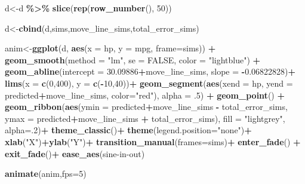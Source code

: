 \documentclass[
]{book}
\newenvironment{Shaded}{\begin{snugshade}}{\end{snugshade}}
\newcommand{\AttributeTok}[1]{\textcolor[rgb]{0.13,0.29,0.53}{#1}}
\newcommand{\ConstantTok}[1]{\textcolor[rgb]{0.56,0.35,0.01}{#1}}
\newcommand{\DecValTok}[1]{\textcolor[rgb]{0.00,0.00,0.81}{#1}}
\newcommand{\FloatTok}[1]{\textcolor[rgb]{0.00,0.00,0.81}{#1}}
\newcommand{\FunctionTok}[1]{\textcolor[rgb]{0.13,0.29,0.53}{\textbf{#1}}}
\newcommand{\NormalTok}[1]{#1}
\newcommand{\OtherTok}[1]{\textcolor[rgb]{0.56,0.35,0.01}{#1}}
\newcommand{\SpecialCharTok}[1]{\textcolor[rgb]{0.81,0.36,0.00}{\textbf{#1}}}
\newcommand{\StringTok}[1]{\textcolor[rgb]{0.31,0.60,0.02}{#1}}
\begin{document}
\begin{Shaded}
\begin{Highlighting}[]
\NormalTok{d}\OtherTok{\textless{}{-}}\NormalTok{d }\SpecialCharTok{\%\textgreater{}\%} \FunctionTok{slice}\NormalTok{(}\FunctionTok{rep}\NormalTok{(}\FunctionTok{row\_number}\NormalTok{(), }\DecValTok{50}\NormalTok{))}

\NormalTok{d}\OtherTok{\textless{}{-}}\FunctionTok{cbind}\NormalTok{(d,sims,move\_line\_sims,total\_error\_sims)}


\NormalTok{anim}\OtherTok{\textless{}{-}}\FunctionTok{ggplot}\NormalTok{(d, }\FunctionTok{aes}\NormalTok{(}\AttributeTok{x =}\NormalTok{ hp, }\AttributeTok{y =}\NormalTok{ mpg, }\AttributeTok{frame=}\NormalTok{sims)) }\SpecialCharTok{+}
  \FunctionTok{geom\_smooth}\NormalTok{(}\AttributeTok{method =} \StringTok{"lm"}\NormalTok{, }\AttributeTok{se =} \ConstantTok{FALSE}\NormalTok{, }\AttributeTok{color =} \StringTok{"lightblue"}\NormalTok{) }\SpecialCharTok{+}  
  \FunctionTok{geom\_abline}\NormalTok{(}\AttributeTok{intercept =} \FloatTok{30.09886}\SpecialCharTok{+}\NormalTok{move\_line\_sims, }\AttributeTok{slope =} \SpecialCharTok{{-}}\FloatTok{0.06822828}\NormalTok{)}\SpecialCharTok{+}
  \FunctionTok{lims}\NormalTok{(}\AttributeTok{x =} \FunctionTok{c}\NormalTok{(}\DecValTok{0}\NormalTok{,}\DecValTok{400}\NormalTok{), }\AttributeTok{y =} \FunctionTok{c}\NormalTok{(}\SpecialCharTok{{-}}\DecValTok{10}\NormalTok{,}\DecValTok{40}\NormalTok{))}\SpecialCharTok{+}
  \FunctionTok{geom\_segment}\NormalTok{(}\FunctionTok{aes}\NormalTok{(}\AttributeTok{xend =}\NormalTok{ hp, }\AttributeTok{yend =}\NormalTok{ predicted}\SpecialCharTok{+}\NormalTok{move\_line\_sims, }\AttributeTok{color=}\StringTok{"red"}\NormalTok{), }\AttributeTok{alpha =}\NormalTok{ .}\DecValTok{5}\NormalTok{) }\SpecialCharTok{+} 
  \FunctionTok{geom\_point}\NormalTok{() }\SpecialCharTok{+}
  \FunctionTok{geom\_ribbon}\NormalTok{(}\FunctionTok{aes}\NormalTok{(}\AttributeTok{ymin =}\NormalTok{ predicted}\SpecialCharTok{+}\NormalTok{move\_line\_sims }\SpecialCharTok{{-}}\NormalTok{ total\_error\_sims, }\AttributeTok{ymax =}\NormalTok{ predicted}\SpecialCharTok{+}\NormalTok{move\_line\_sims }\SpecialCharTok{+}\NormalTok{ total\_error\_sims), }\AttributeTok{fill =} \StringTok{"lightgrey"}\NormalTok{, }\AttributeTok{alpha=}\NormalTok{.}\DecValTok{2}\NormalTok{)}\SpecialCharTok{+} 
  \FunctionTok{theme\_classic}\NormalTok{()}\SpecialCharTok{+}
  \FunctionTok{theme}\NormalTok{(}\AttributeTok{legend.position=}\StringTok{"none"}\NormalTok{)}\SpecialCharTok{+}
  \FunctionTok{xlab}\NormalTok{(}\StringTok{"X"}\NormalTok{)}\SpecialCharTok{+}\FunctionTok{ylab}\NormalTok{(}\StringTok{"Y"}\NormalTok{)}\SpecialCharTok{+}
  \FunctionTok{transition\_manual}\NormalTok{(}\AttributeTok{frames=}\NormalTok{sims)}\SpecialCharTok{+}
  \FunctionTok{enter\_fade}\NormalTok{() }\SpecialCharTok{+} 
  \FunctionTok{exit\_fade}\NormalTok{()}\SpecialCharTok{+}
  \FunctionTok{ease\_aes}\NormalTok{(}\StringTok{\textquotesingle{}sine{-}in{-}out\textquotesingle{}}\NormalTok{)}

\FunctionTok{animate}\NormalTok{(anim,}\AttributeTok{fps=}\DecValTok{5}\NormalTok{)}
\end{Highlighting}
\end{Shaded}
\end{document}

